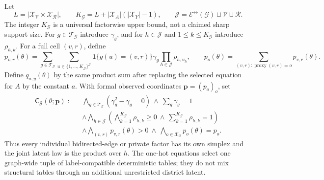 Let
\[
L=\left|\mathcal X_{\mathcal V}\times\mathcal X_{\mathcal R}\right|,
\qquad
K_{\mathcal G}=L+|\mathcal X_A|(|\mathcal X_Y|-1),
\qquad
\mathcal J=\mathcal E^{\leftrightarrow}(\mathcal G)\sqcup\mathcal V\sqcup\mathcal R.
\]
The integer \(K_{\mathcal G}\) is a universal factorwise upper bound, not a claimed sharp support size. For \(g\in\mathcal T_{\mathcal G}\) introduce \(\gamma_g\), and for \(h\in\mathcal J\) and \(1\leq k\leq K_{\mathcal G}\) introduce \(\rho_{h,k}\). For a full cell \((v,r)\), define
\[
p_{v,r}(\theta)=
\sum_{g\in\mathcal T_{\mathcal G}}
\sum_{u\in\{1,\ldots,K_{\mathcal G}\}^{\mathcal J}}
\mathbf 1\{g(u)=(v,r)\}\gamma_g\prod_{h\in\mathcal J}\rho_{h,u_h},
\qquad
p_o(\theta)=\sum_{(v,r):\operatorname{proxy}(v,r)=o}p_{v,r}(\theta).
\]
Define \(q_{a,y}(\theta)\) by the same product sum after replacing the selected equation for \(A\) by the constant \(a\). With formal observed coordinates \(\mathbf p=(p_o)_o\), set
\[
\begin{aligned}
\mathsf C_{\mathcal G}(\theta;\mathbf p):={}&
\bigwedge_{g\in\mathcal T_{\mathcal G}}(\gamma_g^2-\gamma_g=0)
\ \wedge\ \sum_g\gamma_g=1\\
&\wedge\bigwedge_{h\in\mathcal J}
\left(\bigwedge_{k=1}^{K_{\mathcal G}}\rho_{h,k}\geq0
\ \wedge\ \sum_{k=1}^{K_{\mathcal G}}\rho_{h,k}=1\right)\\
&\wedge\bigwedge_{(v,r)}p_{v,r}(\theta)>0
\ \wedge\ \bigwedge_{o\in\mathcal X_{\mathcal O}}p_o(\theta)=p_o.
\end{aligned}
\]
Thus every individual bidirected-edge or private factor has its own simplex and the joint latent law is the product over \(h\). The one-hot equations select one graph-wide tuple of label-compatible deterministic tables; they do not mix structural tables through an additional unrestricted district latent.